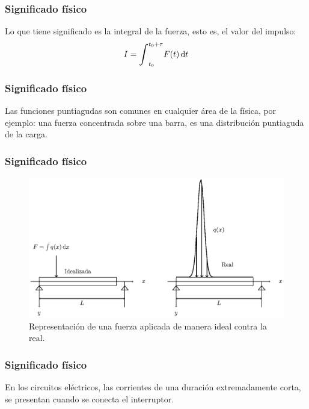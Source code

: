 \documentclass[12pt]{beamer}
\begin{document}
\begin{frame}
\frametitle{Significado físico}
Lo que tiene significado es la integral de la fuerza, esto es, el valor del impulso:
\pause
\begin{align*}
I = \scaleint{6ex}_{t_{0}}^{t_{0} + \tau } F (t) \dd{t}
\end{align*}
\end{frame}
\begin{frame}
\frametitle{Significado físico}
Las funciones puntiagudas son comunes en cualquier área de la física, \pause por ejemplo: una fuerza concentrada sobre una barra, es una distribución puntiaguda de la carga. %
\end{frame}
\begin{frame}
\frametitle{Significado físico}
\begin{figure}[H]
    \centering
    \includegraphics[scale=1]{Imagenes/delta_Dirac_02.eps}
    \caption{Representación de una fuerza aplicada de manera ideal contra la real.}
    \label{fig:figura_delta_Dirac_02}
\end{figure}
\end{frame}
\begin{frame}
\frametitle{Significado físico}
En los circuitos eléctricos, las corrientes  de una duración extremadamente corta, se presentan cuando se conecta el interruptor.
\end{frame}
\end{document}
